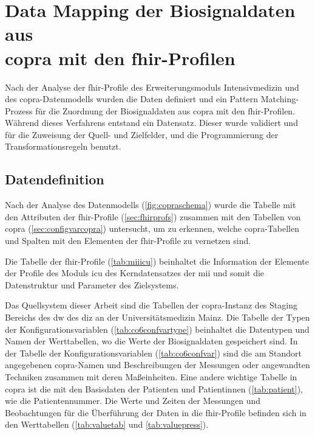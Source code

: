 \section[Data Mapping der Biosignaldaten aus \acs{copra} mit den \acs{fhir}-Profilen]{Data Mapping der Biosignaldaten aus \\ \acs{copra} mit den \acs{fhir}-Profilen} \label{sec:datamappingicucopra}

Nach der Analyse der \ac{fhir}-Profile des Erweiterungsmoduls \glqq Intensivmedizin\grqq{} und des \ac{copra}-Datenmodells wurden die Daten definiert und ein Pattern Matching-Prozess für die Zuordnung der Biosignaldaten aus \ac{copra} mit den \ac{fhir}-Profilen. Während dieses Verfahrens entstand ein Datensatz. Dieser wurde validiert und für die Zuweisung der Quell- und Zielfelder, und die Programmierung der Transformationsregeln benutzt.

\subsection{Datendefinition} \label{subsec:datadef}

Nach der Analyse des Datenmodells (\ref{fig:copraschema}) wurde die Tabelle mit den Attributen der \ac{fhir}-Profile (\ref{sec:fhirprofs}) zusammen mit den Tabellen von \ac{copra} (\ref{sec:configvarcopra}) untersucht, um zu erkennen, welche \ac{copra}-Tabellen und Spalten mit den Elementen der \ac{fhir}-Profile zu vernetzen sind.

Die Tabelle der \ac{fhir}-Profile (\ref{tab:miiicu}) beinhaltet die Information der Elemente der Profile des Moduls \glqq\ac{icu}\grqq{} des Kerndatensatzes der \ac{mii} und somit die Datenstruktur und Parameter des Zielsystems.

Das Quellsystem dieser Arbeit sind die Tabellen der \ac{copra}-Instanz des Staging Bereichs des \ac{dw} des \ac{diz} an der Universitätsmedizin Mainz. Die Tabelle der Typen der Konfigurationsvariablen (\ref{tab:co6confvartype}) beinhaltet die Datentypen und Namen der Werttabellen, wo die Werte der Biosignaldaten gespeichert sind. In der Tabelle der Konfigurationsvariablen (\ref{tab:co6confvar}) sind die am Standort angegebenen \ac{copra}-Namen und Beschreibungen der Messungen oder angewandten Techniken zusammen mit deren Maßeinheiten. Eine andere wichtige Tabelle in \ac{copra} ist die mit den Basisdaten der Patienten und Patientinnen (\ref{tab:patient}), wie die Patientennummer. Die Werte und Zeiten der Messungen und Beobachtungen für die Überführung der Daten in die \ac{fhir}-Profile befinden sich in den Werttabellen (\ref{tab:valuetab} und \ref{tab:valuepress}).

